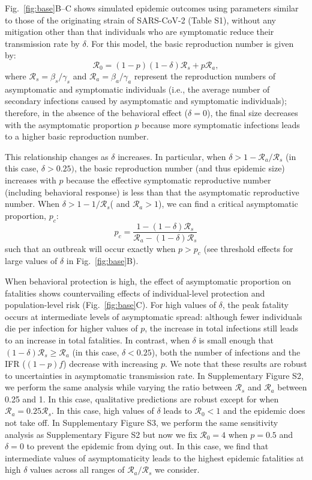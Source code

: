 \documentclass[12pt]{article}
\newcommand{\fref}[1]{Fig.~\ref{fig:#1}}
\newcommand{\RR}{\ensuremath{{\mathcal R}}\xspace}
\begin{document}
\fref{base}B--C shows simulated epidemic outcomes using parameters similar to those of the originating strain of SARS-CoV-2 (Table S1), without any mitigation other than that individuals who are symptomatic reduce their transmission rate by $\delta$. 
For this model, the basic reproduction number is given by:
\begin{equation}
\RR_0 = (1-p) (1-\delta) \RR_s + p \RR_a,
\end{equation}
where $\RR_s = \beta_s/\gamma_s$ and $\RR_a = \beta_a/\gamma_a$ represent the reproduction numbers of asymptomatic and symptomatic individuals (i.e., the average number of secondary infections caused by asymptomatic and symptomatic individuals);
therefore, in the absence of the behavioral effect ($\delta=0$), the final size decreases with the asymptomatic proportion $p$ because more symptomatic infections leads to a higher basic reproduction number.

This relationship changes as $\delta$ increases.
In particular, when $\delta > 1-\RR_a/\RR_s$ (in this case, $\delta > 0.25)$, the basic reproduction number (and thus epidemic size) increases with $p$ because the effective symptomatic reproductive number (including behavioral response) is less than that the asymptomatic reproductive number.
When $\delta > 1-1/\RR_s$( and $\RR_a>1$), we can find a critical asymptomatic proportion, $p_c$:
\begin{equation}
    p_c = \frac{1 - (1-\delta) \RR_s}{\RR_a - (1-\delta) \RR_s}
\end{equation}
such that an outbreak will occur exactly when $p>p_c$ (see threshold effects for large values of $\delta$ in \fref{base}B).

When behavioral protection is high, the effect of asymptomatic proportion on fatalities shows countervailing effects of individual-level protection and population-level risk (\fref{base}C).
For high values of $\delta$, the peak fatality occurs at intermediate levels of asymptomatic spread:
although fewer individuals die per infection for higher values of $p$, the increase in total infections still leads to an increase in total fatalities.
In contrast, when $\delta$ is small enough that $(1-\delta) \RR_s \geq \RR_a$ (in this case, $\delta < 0.25$), both the number of infections and the IFR ($(1-p)f$) decrease with increasing $p$.
We note that these results are robust to uncertainties in asymptomatic transmission rate.
In Supplementary Figure S2, we perform the same analysis while varying the ratio between $\RR_s$ and $\RR_a$ between 0.25 and 1.
In this case, qualitative predictions are robust except for when $\RR_a = 0.25 \RR_s$.
In this case, high values of $\delta$ leads to $\RR_0 < 1$ and the epidemic does not take off.
In Supplementary Figure S3, we perform the same sensitivity analysis as Supplementary Figure S2 but now we fix $\RR_0 = 4$ when $p=0.5$ and $\delta=0$ to prevent the epidemic from dying out.
In this case, we find that intermediate values of asymptomaticity leads to the highest epidemic fatalities at high $\delta$ values across all ranges of $\RR_a/\RR_s$ we consider.
\end{document}
